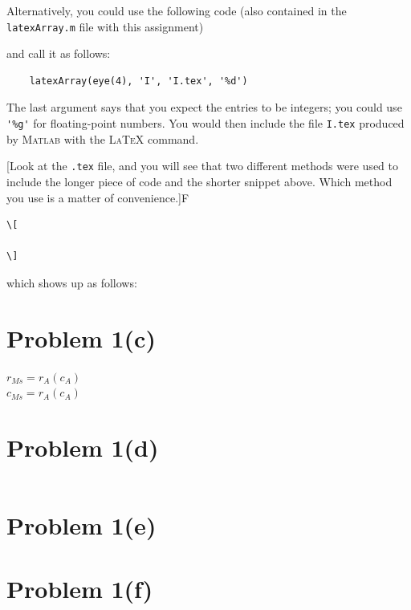 \documentclass{article}
\begin{document}
Alternatively, you could use the following code (also contained in the \verb#latexArray.m# file with this assignment)


and call it as follows:
\begin{verbatim}
    latexArray(eye(4), 'I', 'I.tex', '%d')
\end{verbatim}
The last argument says that you expect the entries to be integers; you could use \verb#'%g'# for floating-point numbers. You would then include the file \verb#I.tex# produced by \textsc{Matlab} with the \textsc{LaTeX} command.

[Look at the \verb#.tex# file, and you will see that two different methods were used to include the longer piece of code and the shorter snippet above. Which method you use is a matter of convenience.]F

\begin{verbatim}
\[
    
\]
\end{verbatim}
which shows up as follows:
\[
    
\]
\fi

\section*{Problem 1(c)}

$r_{Ms} = r_A(c_A)$\\
$c_{Ms} = r_A(c_A)$

\section*{Problem 1(d)}

\[
    
\]

\section*{Problem 1(e)}


\section*{Problem 1(f)}

\[
    
    
\]

\[
    
    
\]

\[
    
    
\]
\end{document}
